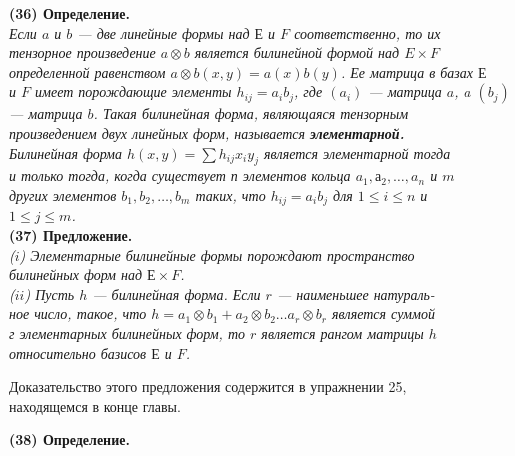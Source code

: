 \documentclass{mai_book}
\begin{document}
{	\noindent\textbf{ (36) Определение. }\\
	\indent \textit{Если $a$ и $b$ — две линейные формы над $Е$ и $F$ соответственно, то их \\
		тензорное произведение $a \otimes b$ является билинейной формой над $E \times F$ \\ 
		определенной равенством $a \otimes b (x,y) = a(x)b(y)$. Ее матрица в базах $Е$ \\ 
		и $F$ имеет порождающие элементы $h_{ij} = a_ib_j$, где $(a_i)$ — матрица $a$,} 
	\newpage
	\noindent \textit{a $(b_j)$ — матрица $b$. Такая билинейная форма, являющаяся тензорным\\ 
		произведением двух линейных форм, называется \textbf{элементарной.} \\
		\indent Билинейная форма $h(x,y) = \sum h_{ij}x_iy_j$ является элементарной тогда\\ 
		и только тогда, когда существует п элементов кольца $a_1, а_2,\ldots, a_n$  и $m $ \\
		других элементов $b_1, b_2, \ldots, b_m$ таких, что $h_{ij} = a_ib_j$  для $1 \leq i \leq n$ и \\
		$1 \leq j \leq m$.} \\
	
\medskip
		\noindent \textbf{(37) Предложение. }\\
		
		\indent \textit{($i$) Элементарные билинейные формы порождают пространство  \\
			билинейных форм над $Е \times F$. }\\
		\indent \textit{ ($ii$) Пусть $h$ — билинейная форма. Если $r$ — наименьшее натураль-\\ное число, такое, что $h = a_1\otimes b_1 + a_2\otimes b_2 \ldots a_r\otimes b_r$ является суммой \\
			г элементарных билинейных форм, то $r$ является рангом матрицы $h$ 
			относительно базисов $Е$ и $F$. }
		
		\smallskip
		\indent Доказательство этого предложения содержится в упражнении 25, \\
		находящемся в конце главы. 
		
		\medskip
		\noindent \textbf{(38) Определение.  } \\
		
}
\end{document}
